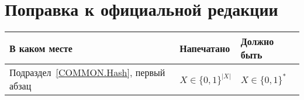 \clearpage
\chapter*{\mbox{}\hfill Поправка к официальной редакции\hfill\mbox{}}

\mbox{}

\begin{center}
\begin{tabular}{|p{3.5cm}|p{6cm}|p{6cm}|}
\hline
В каком месте & Напечатано & Должно быть\\
\hline
\hline
Подраздел~\ref{COMMON.Hash},
первый абзац
&
$X\in\{0,1\}^{|X|}$ &
$X\in\{0,1\}^*$
\\
\hline
\end{tabular}
\end{center}